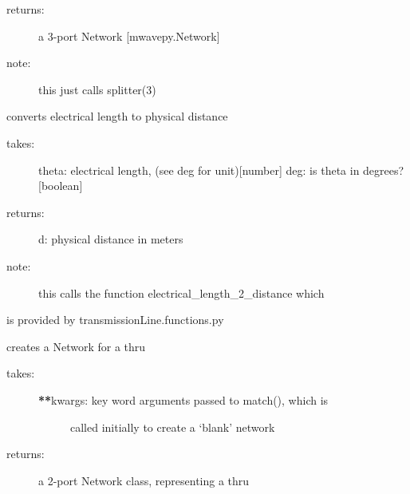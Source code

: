 \documentclass[letterpaper,10pt,english]{sphinxmanual}
\begin{document}
\begin{fulllineitems}
\begin{fulllineitems}
\begin{description}
\item[{returns:}] \leavevmode
a 3-port Network {[}mwavepy.Network{]}

\item[{note:}] \leavevmode
this just calls splitter(3)

\end{description}

\end{fulllineitems}


\begin{fulllineitems}
\label{auto_workingband:mwavepy.WorkingBand.theta_2_d}
converts electrical length to physical distance
\begin{description}
\item[{takes:}] \leavevmode
theta: electrical length, (see deg for unit){[}number{]}
deg: is theta in degrees? {[}boolean{]}

\item[{returns:}] \leavevmode
d: physical distance in meters

\item[{note:}] \leavevmode
this calls the function electrical\_length\_2\_distance which

\end{description}

is provided by transmissionLine.functions.py

\end{fulllineitems}


\begin{fulllineitems}
\label{auto_workingband:mwavepy.WorkingBand.thru}
creates a Network for a thru
\begin{description}
\item[{takes:}] \leavevmode\begin{description}
\item[{{\color{red}\bfseries{}**}kwargs: key word arguments passed to match(), which is }] \leavevmode
called initially to create a `blank' network

\end{description}

\item[{returns:}] \leavevmode
a 2-port Network class, representing a thru


\end{description}
\end{fulllineitems}
\end{fulllineitems}
\end{document}
